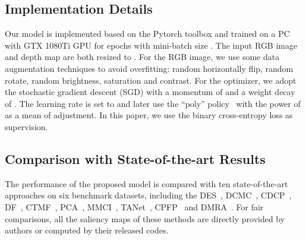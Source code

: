 \documentclass[runningheads]{llncs}
\begin{document}
\subsection{Implementation Details} 
 Our model is implemented based on the Pytorch toolbox and trained on a PC with GTX 1080Ti GPU for  epochs with mini-batch size . The input RGB image and depth map are both resized to . For the RGB image, we use some data augmentation techniques to avoid overfitting: random horizontally flip, random rotate, random brightness, saturation and contrast. For the optimizer, we adopt the stochastic gradient descent (SGD) with a momentum of  and a weight decay of . The learning rate is set to  and later use the ``poly'' policy~\cite{poly} with the power of  as a mean of adjustment. In this paper, we  use the binary cross-entropy loss as supervision.
\subsection{Comparison with State-of-the-art Results}
The performance of the proposed model is compared
with ten state-of-the-art approaches on six benchmark datasets, including the DES~\cite{RGBD135}, DCMC~\cite{DCMC}, CDCP~\cite{CDCP}, DF~\cite{DF}, CTMF~\cite{CTMF}, PCA~\cite{PCA}, MMCI~\cite{MMCI}, TANet~\cite{TANet}, CPFP~\cite{CPFP} and DMRA~\cite{DMRA}. For fair comparisons, all the saliency maps of these methods are directly provided by authors or computed by their released codes.
\end{document}
